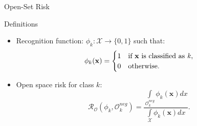 \begin{frame}{Open-Set Risk}
    \begin{definitionblock}{Definitions}
        \begin{itemize}
            \item <1-> Recognition function: 
            $\phi_k: \mathcal{X} \to \{0,1\}$ such that:
            \[
                \phi_k(\mathbf{x}) = \begin{cases}
                1 & \text{if $\mathbf{x}$ is classified as \emph{k}}, \\
                0 & \text{otherwise}.
                \end{cases}
            \]
            \item <2-> Open space risk for class $k$:
            \[
                \mathcal{R}_{\mathcal{O}}(\phi_k, \mathcal{O}^{neg}_k) = \frac{\int \limits_{\mathcal{O}^{neg}_k} \phi_k(\mathbf{x})dx}{\int \limits_{\mathcal{X}} \phi_k(\mathbf{x})dx}.
            \]
        \end{itemize}
    \end{definitionblock}
\end{frame}